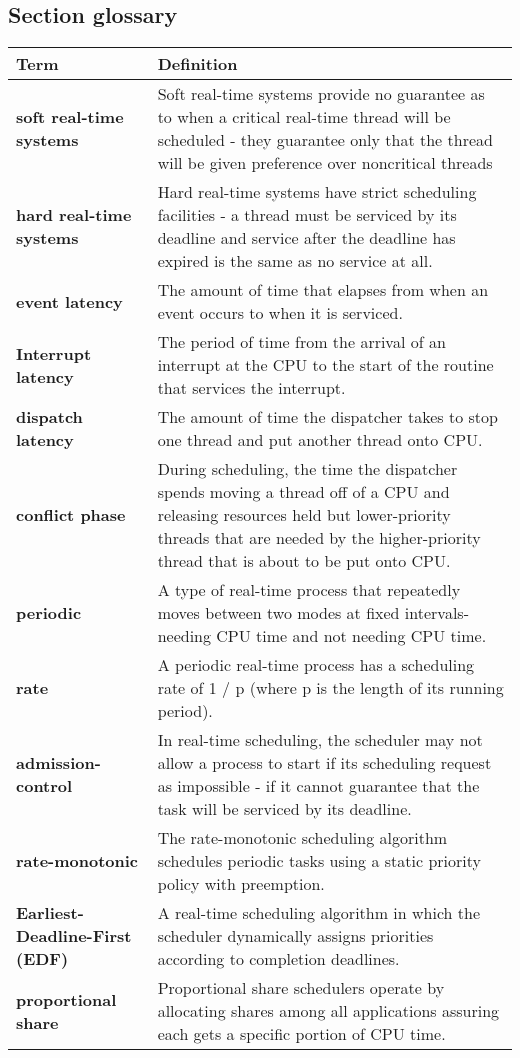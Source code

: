 \subsection*{Section glossary}
\centering
\begin{tabular}{>{\raggedright}p{} >{\raggedright\arraybackslash}p{}}
\toprule
\textbf{Term} & \textbf{Definition} \\
\midrule
\textbf{soft real-time systems} & Soft real-time systems provide no guarantee as to when a critical real-time thread will be scheduled - they guarantee only that the thread will be given preference over noncritical threads \\
\textbf{hard real-time systems} & Hard real-time systems have strict scheduling facilities - a thread must be serviced by its deadline and service after the deadline has expired is the same as no service at all. \\
\textbf{event latency} & The amount of time that elapses from when an event occurs to when it is serviced. \\
\textbf{Interrupt latency} & The period of time from the arrival of an interrupt at the CPU to the start of the routine that services the interrupt. \\
\textbf{dispatch latency} & The amount of time the dispatcher takes to stop one thread and put another thread onto CPU. \\
\textbf{conflict phase} & During scheduling, the time the dispatcher spends moving a thread off of a CPU and releasing resources held but lower-priority threads that are needed by the higher-priority thread that is about to be put onto CPU. \\
\textbf{periodic} & A type of real-time process that repeatedly moves between two modes at fixed intervals- needing CPU time and not needing CPU time. \\
\textbf{rate} & A periodic real-time process has a scheduling rate of 1 / p (where p is the length of its running period). \\
\textbf{admission-control} & In real-time scheduling, the scheduler may not allow a process to start if its scheduling request as impossible - if it cannot guarantee that the task will be serviced by its deadline. \\
\textbf{rate-monotonic} & The rate-monotonic scheduling algorithm schedules periodic tasks using a static priority policy with preemption. \\
\textbf{Earliest-Deadline-First (EDF)} & A real-time scheduling algorithm in which the scheduler dynamically assigns priorities according to completion deadlines. \\
\textbf{proportional share} & Proportional share schedulers operate by allocating shares among all applications assuring each gets a specific portion of CPU time. \\
\bottomrule
\end{tabular}
\vspace{\baselineskip}
